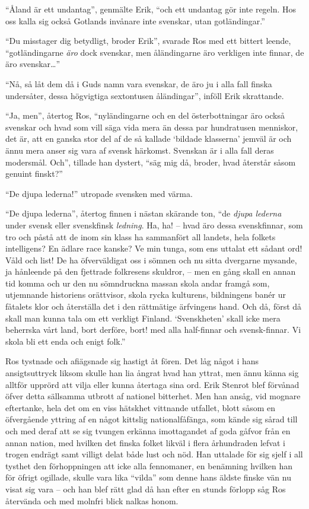 ``Åland är ett undantag'', genmälte Erik, ``och ett undantag gör inte
regeln. Hos oss kalla sig också Gotlands invånare inte svenskar, utan
gotländingar.''

``Du misstager dig betydligt, broder Erik'', svarade Ros med ett bittert
leende, ``gotländingarne \emph{äro} dock svenskar, men åländingarne äro
verkligen inte finnar, de äro svenskar\ldots{}''

``Nå, så låt dem då i Guds namn vara svenskar, de äro ju i alla fall
finska undersåter, dessa högvigtiga sextontusen åländingar'', inföll
Erik skrattande.

``Ja, men'', återtog Ros, ``nyländingarne och en del österbottningar äro
också svenskar och hvad som vill säga vida mera än dessa par hundratusen
menniskor, det är, att en ganska stor del af de så kallade `bildade
klasserna' jemväl är och ännu mera anser sig vara af svensk härkomst.
Svenskan är i alla fall deras modersmål. Och'', tillade han dystert,
``säg mig då, broder, hvad återstår såsom genuint finskt?''

``De djupa lederna!'' utropade svensken med värma.

``De djupa lederna'', återtog finnen i nästan skärande ton, ``de
\emph{djupa lederna} under svensk eller svenskfinsk \emph{ledning}. Ha,
ha! -- hvad äro dessa svenskfinnar, som tro och påstå att de inom sin
klass ha sammanfört all landets, hela folkets intelligens? En ädlare
race kanske? Ve min tunga, som ens uttalat ett sådant ord! Våld och
list! De ha öfverväldigat oss i sömnen och nu sitta dvergarne mysande,
ja hånleende på den fjettrade folkresens skuldror, -- men en gång skall
en annan tid komma och ur den nu sömndruckna massan skola andar framgå
som, utjemnande historiens orättvisor, skola rycka kulturens,
bildningens banér ur fåtalets klor och återställa det i den rättmätige
ärfvingens hand. Och då, först då skall man kunna tala om ett verkligt
Finland. `Svenskheten' skall icke mera beherrska vårt land, bort
derföre, bort! med alla half-finnar och svensk-finnar. Vi skola bli ett
enda och enigt folk.''

Ros tystnade och afiägsnade sig hastigt åt fören. Det låg något i hans
ansigtsuttryck liksom skulle han lia ångrat hvad han yttrat, men ännu
känna sig alltför upprörd att vilja eller kunna återtaga sina ord. Erik
Stenrot blef förvånad öfver detta sällsamma utbrott af nationel
bitterhet. Men han ansåg, vid mognare eftertanke, hela det om en viss
hätskhet vittnande utfallet, blott såsom en öfvergående yttring af en
något kittslig nationalfåfänga, som kände sig sårad till och med deraf
att se sig tvungen erkänna imottagandet af goda gåfvor från en annan
nation, med hvilken det finska folket likväl i flera århundraden lefvat
i trogen endrägt samt villigt delat både lust och nöd. Han uttalade för
sig sjelf i all tysthet den förhoppningen att icke alla fennomaner, en
benämning hvilken han för öfrigt ogillade, skulle vara lika ``vilda''
som denne hans äldste finske vän nu visat sig vara -- och han blef rätt
glad då han efter en stunds förlopp såg Ros återvända och med molnfri
blick nalkas honom.

